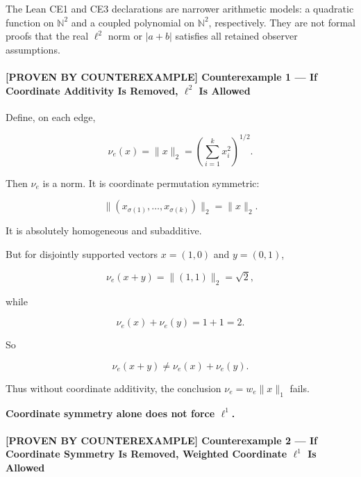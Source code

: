 \documentclass[
  11pt,
]{article}
\renewenvironment{quote}
  {\begin{leftbar}\small}
  {\end{leftbar}}
\begin{document}
The Lean CE1 and CE3 declarations are narrower arithmetic models: a
quadratic function on \(\mathbb N^2\) and a coupled polynomial on
\(\mathbb N^2\), respectively. They are not formal proofs that the real
\(\ell^2\) norm or \(|a+b|\) satisfies all retained observer
assumptions.

\hypertarget{proven-by-counterexample-counterexample-1-if-coordinate-additivity-is-removed-ell2-is-allowed}{%
\paragraph{\texorpdfstring{\textbf{{[}PROVEN BY COUNTEREXAMPLE{]}
Counterexample 1 --- If Coordinate Additivity Is Removed, \(\ell^2\) Is
Allowed}}{{[}PROVEN BY COUNTEREXAMPLE{]} Counterexample 1 --- If Coordinate Additivity Is Removed, \textbackslash ell\^{}2 Is Allowed}}\label{proven-by-counterexample-counterexample-1-if-coordinate-additivity-is-removed-ell2-is-allowed}}

Define, on each edge,

\[
\nu_e(x)=\|x\|_2 = \left(\sum_{i=1}^k x_i^2\right)^{1/2}.
\]

Then \(\nu_e\) is a norm. It is coordinate permutation symmetric:

\[
\|(x_{\sigma(1)},\ldots,x_{\sigma(k)})\|_2=\|x\|_2.
\]

It is absolutely homogeneous and subadditive.

But for disjointly supported vectors \(x=(1,0)\) and \(y=(0,1)\),

\[
\nu_e(x+y)=\|(1,1)\|_2=\sqrt2,
\]

while

\[
\nu_e(x)+\nu_e(y)=1+1=2.
\]

So

\[
\nu_e(x+y)\ne\nu_e(x)+\nu_e(y).
\]

Thus without coordinate additivity, the conclusion \(\nu_e=w_e\|x\|_1\)
fails.

\begin{quote}
\textbf{Coordinate symmetry alone does not force \(\ell^1\).}
\end{quote}

\hypertarget{proven-by-counterexample-counterexample-2-if-coordinate-symmetry-is-removed-weighted-coordinate-ell1-is-allowed}{%
\paragraph{\texorpdfstring{\textbf{{[}PROVEN BY COUNTEREXAMPLE{]}
Counterexample 2 --- If Coordinate Symmetry Is Removed, Weighted
Coordinate \(\ell^1\) Is
Allowed}}{{[}PROVEN BY COUNTEREXAMPLE{]} Counterexample 2 --- If Coordinate Symmetry Is Removed, Weighted Coordinate \textbackslash ell\^{}1 Is Allowed}}\label{proven-by-counterexample-counterexample-2-if-coordinate-symmetry-is-removed-weighted-coordinate-ell1-is-allowed}}
\end{document}
